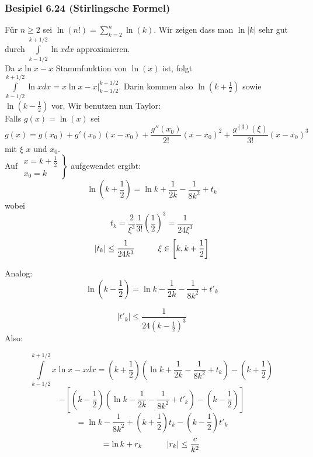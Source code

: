 \subsubsection*{Besipiel 6.24 (Stirlingsche Formel)}
Für $n\geq 2$ sei $\ln (n!) = \sum\limits_{k = 2}^n {\ln (k)} $. Wir zeigen dass man $\ln\left| k\right|$ sehr gut durch $\int\limits_{k - 1/2}^{k + 1/2} {\ln xdx} $ approximieren.\\

Da $x\ln x-x$ Stammfunktion von $\ln(x)$ ist, folgt $\int\limits_{k - 1/2}^{k + 1/2} {\ln xdx}  = \left. {x\ln x - x} \right|_{k - 1/2}^{k + 1/2}$. Darin kommen also $\ln\left(k+\frac{1}{2}\right)$ sowie $\ln\left(k-\frac{1}{2}\right)$ vor. Wir benutzen nun Taylor:\\

Falls $g(x)=\ln(x)$ sei $$g(x)=g(x_0)+g'(x_0)(x-x_0)+\frac{g''(x_0)}{2!}(x-x_0)^2+\frac{g^{(3)}(\xi)}{3!}(x-x_0)^3$$ mit $\xi$  $x$ und $x_0$.\\

Auf $\left. {\begin{array}{*{20}{c}}
{x = k + \frac{1}{2}}\\
{{x_0} = k}
\end{array}} \right\}$ aufgewendet ergibt:
\[\ln \left( {k + \frac{1}{2}} \right) = \ln k + \frac{1}{{2k}} - \frac{1}{{8{k^2}}} + {t_k}\]
wobei $${t_k} = \frac{2}{{{\xi ^3}}}\frac{1}{{3!}}{\left( {\frac{1}{2}} \right)^3} = \frac{1}{{24{\xi ^3}}}$$
\[\left| {{t_k}} \right| \le \frac{1}{{24{k^3}}}\text{\hspace{10mm}}\xi  \in \left[ {k,k + \frac{1}{2}} \right]\]

Analog:
\[\ln \left( {k - \frac{1}{2}} \right) = \ln k - \frac{1}{{2k}} - \frac{1}{{8{k^2}}} + {t'_k}\]

\[\left| {{t'_k}} \right| \le \frac{1}{{24{\left(k-\frac{1}{2}\right)^3}}}\]
Also:

\[\int\limits_{k - 1/2}^{k + 1/2} {x\ln x - xdx = \left( {k + \frac{1}{2}} \right)} \left( {\ln k + \frac{1}{{2k}} - \frac{1}{{8{k^2}}} + {t_k}} \right) - \left( {k + \frac{1}{2}} \right)\]
$$ - \left[ {\left( {k - \frac{1}{2}} \right)\left( {\ln k - \frac{1}{{2k}} - \frac{1}{{8{k^2}}} + t{'_k}} \right) - \left( {k - \frac{1}{2}} \right)} \right]$$
$$ = \ln k - \frac{1}{{8{k^2}}} + \left( {k + \frac{1}{2}} \right){t_k} - \left( {k - \frac{1}{2}} \right)t{'_k}$$
$$ = \ln k + {r_k}\text{\hspace{10mm}}\left| {{r_k}} \right| \le \frac{c}{{{k^2}}}$$


